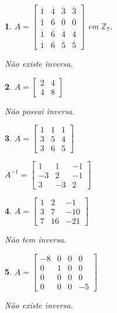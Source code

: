 \documentclass[12pt]{exam}
\newtheorem{exercicio}{}
\newcommand{\integer}{\mathbb{Z}}
\begin{document}
\begin{exercicio}
$A = \begin{bmatrix}
    \overline{1} & \overline{4} & \overline{3} & \overline{3}\\
    \overline{1} & \overline{6} & \overline{0} & \overline{0}\\
    \overline{1} & \overline{6} & \overline{4} & \overline{4}\\
    \overline{1} & \overline{6} & \overline{5} & \overline{5}
  \end{bmatrix}$ em $\integer_7$.
\begin{solucao}
  N\~ao existe inversa.
\end{solucao}
\end{exercicio}

\begin{exercicio}
$A =\begin{bmatrix}
    2 & 4\\
    4 & 8
  \end{bmatrix}$
\begin{solucao}
  N\~ao possui inversa.
\end{solucao}
\end{exercicio}

\begin{exercicio}
$A =\begin{bmatrix}
    1 & 1 & 1\\
    3 & 5 & 4\\
    3 & 6 & 5
  \end{bmatrix}$
\begin{solucao}
  $A^{-1} =\begin{bmatrix}
    1 & 1 & -1\\
    -3 & 2 & -1\\
    3 & -3 & 2
  \end{bmatrix}$
\end{solucao}
\end{exercicio}

\begin{exercicio}
$A =\begin{bmatrix}
    1 & 2 & -1\\
    3 & 7 & -10\\
    7 & 16 & -21
  \end{bmatrix}$
\begin{solucao}
  N\~ao tem inversa.
\end{solucao}
\end{exercicio}

\begin{exercicio}
$A =\begin{bmatrix}
    -8 & 0 & 0 & 0\\
    0 & 1 & 0 & 0\\
    0 & 0 & 0 & 0\\
    0 & 0 & 0 & -5
  \end{bmatrix}$
\begin{solucao}
 N\~ao existe inversa.
\end{solucao}
\end{exercicio}
\end{document}
